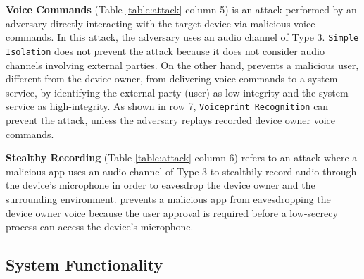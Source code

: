 \textbf{Voice Commands} (Table \ref{table:attack} column 5) is an attack performed by an adversary directly interacting with the target device via malicious voice commands. In this attack, the adversary uses an audio channel of Type 3. \texttt{Simple Isolation} does not prevent the attack because it does not consider audio channels involving external parties. On the other hand, \system prevents a malicious user, different from the device owner, from delivering voice commands to a system service, by identifying the external party (user) as low-integrity and the system service as high-integrity. As shown in row 7, \texttt{Voiceprint Recognition} can prevent the attack, unless the adversary replays recorded device owner voice commands.

\textbf{Stealthy Recording} (Table \ref{table:attack} column 6) refers to an attack where a malicious app uses an audio channel of Type 3 to stealthily record audio through the device's microphone in order to eavesdrop the device owner and the surrounding environment. \system prevents a malicious app from eavesdropping the device owner voice because the user approval is required before a low-secrecy process can access the device's microphone.

\vspace{-0.08in}


\subsection{System Functionality}



